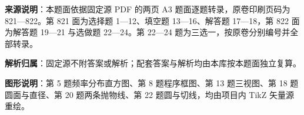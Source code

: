 

\begin{gknotice}
\textbf{来源说明}：本题面依据固定源 PDF 的两页 A3 题面逐题转录，原卷印刷页码为 821—822。第 821 面为选择题 1—12、填空题 13—16、解答题 17—18，第 822 面为解答题 19—21 与选做题 22—24。第 22—24 题为三选一，按原卷分别编号并全部转录。

\textbf{解析归属}：固定源不附答案或解析；配套答案与解析均由本库按本题面独立复算。

\textbf{图形说明}：第 5 题频率分布直方图、第 8 题程序框图、第 13 题三视图、第 18 题圆面与直径、第 20 题两条抛物线、第 22 题圆与切线，均由项目内 TikZ 矢量源重绘。
\end{gknotice}


